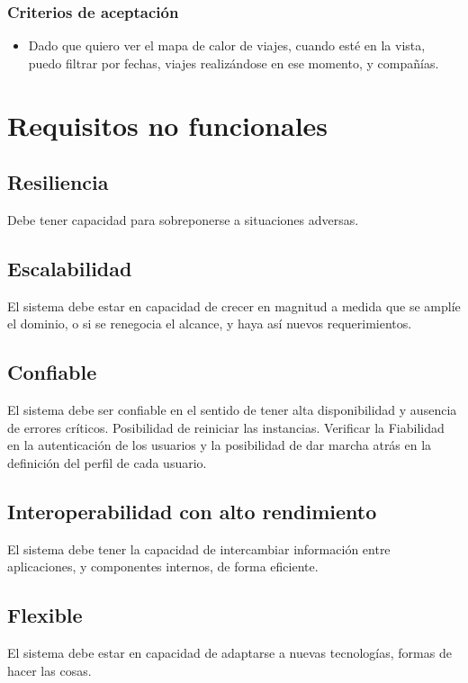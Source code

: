 \documentclass{article}
\begin{document}
\subsubsection{Criterios de aceptación}
\begin{itemize}
    \item Dado que quiero ver el mapa de calor de viajes, cuando esté en la vista, puedo filtrar por fechas, viajes realizándose en ese momento, y compañías.
\end{itemize}

\section{Requisitos no funcionales}

\subsection{Resiliencia}
Debe tener capacidad para sobreponerse a situaciones adversas.

\subsection{Escalabilidad}
El sistema debe estar en capacidad de crecer en magnitud a medida que se amplíe el dominio, o si se renegocia el alcance, y haya así nuevos requerimientos.

\subsection{Confiable}
El sistema debe ser confiable en el sentido de tener alta disponibilidad y ausencia de errores críticos. Posibilidad de reiniciar las instancias. Verificar la Fiabilidad en la autenticación de los usuarios y la posibilidad de dar marcha atrás en la definición del perfil de cada usuario.

\subsection{Interoperabilidad con alto rendimiento}
El sistema debe tener la capacidad de intercambiar información entre aplicaciones, y componentes internos, de forma eficiente.

\subsection{Flexible}
El sistema debe estar en capacidad de adaptarse a nuevas tecnologías, formas de hacer las cosas.
\end{document}
